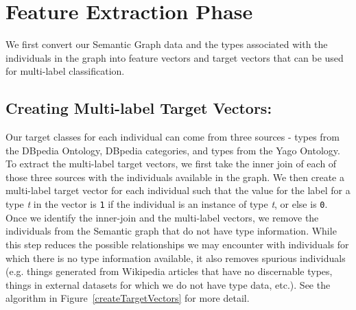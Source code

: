 \documentclass[runningheads,a4paper]{IEEEtran}
\begin{document}
\section{Feature Extraction Phase}
\label{vectorGenerationAndFeatureExtraction}
We first convert our Semantic Graph data and the types associated with the individuals in the graph into feature vectors and target vectors that can be used for multi-label classification. 

\subsection{Creating Multi-label Target Vectors:}
\label{targetVector}
Our target classes for each individual can come from three sources - types from the DBpedia Ontology, DBpedia categories,
and types from the Yago \cite{suchanek2007yago} Ontology. To extract the multi-label target vectors, we first take the inner join of each of those three sources with the individuals available in the graph. We then create a multi-label target vector for each individual such that the value for the label for a type \textit{t} in the vector is \texttt{1} if the individual is an instance of type \textit{t}, or else is \texttt{0}.
Once we identify the inner-join and the multi-label vectors, we remove the individuals from the Semantic graph that do not have type information. While this step reduces the possible relationships we may encounter with individuals for which there is no type information available, it also removes spurious individuals (e.g. things generated from Wikipedia articles that have no discernable types, things in external datasets for which we do not have type data, etc.). See the algorithm in Figure~\ref{createTargetVectors} for more detail.
\end{document}
